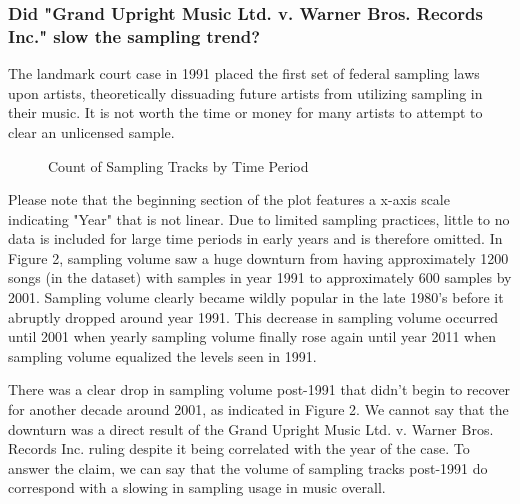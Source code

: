 \documentclass[pageno]{jpaper}
\begin{document}
\subsubsection{Did "Grand Upright Music Ltd. v. Warner Bros. Records Inc." slow the sampling trend?}
The landmark court case in 1991 placed the first set of federal sampling laws upon artists, theoretically dissuading future artists from utilizing sampling in their music. It is not worth the time or money for many artists to attempt to clear an unlicensed sample.
\begin{figure}[H]
\caption{Count of Sampling Tracks by Time Period}
\label{fig:fig2}
\centering
\end{figure}
Please note that the beginning section of the plot features a x-axis scale indicating "Year" that is not linear. Due to limited sampling practices, little to no data is included for large time periods in early years and is therefore omitted. In Figure 2, sampling volume saw a huge downturn from having approximately 1200 songs (in the dataset) with samples in year 1991 to approximately 600 samples by 2001. Sampling volume clearly became wildly popular in the late 1980's before it abruptly dropped around year 1991. This decrease in sampling volume occurred until 2001 when yearly sampling volume finally rose again until year 2011 when sampling volume equalized the levels seen in 1991. 

There was a clear drop in sampling volume post-1991 that didn't begin to recover for another decade around 2001, as indicated in Figure 2. We cannot say that the downturn was a direct result of the Grand Upright Music Ltd. v. Warner Bros. Records Inc. ruling despite it being correlated with the year of the case. To answer the claim, we can say that the volume of sampling tracks post-1991 do correspond with a slowing in sampling usage in music overall.
\end{document}
